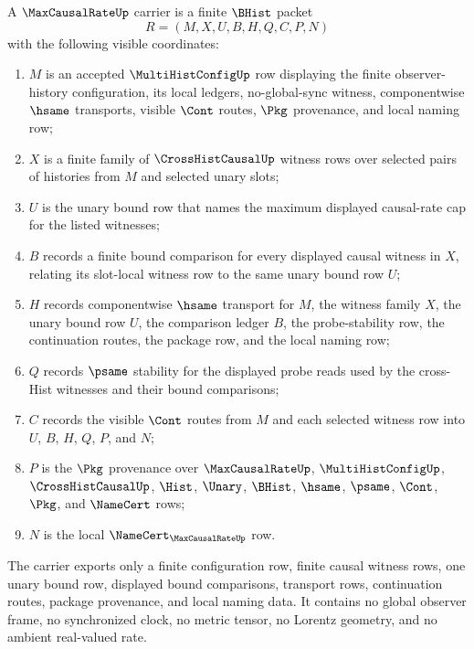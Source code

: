 \begin{definition}
\label{def:max-causal-rate-carrier}
A $\MaxCausalRateUp$ carrier is a finite $\BHist$ packet
$$
R=(M,X,U,B,H,Q,C,P,N)
$$
with the following visible coordinates:
\begin{enumerate}
\item $M$ is an accepted $\MultiHistConfigUp$ row displaying the finite observer-history configuration, its local ledgers, no-global-sync witness, componentwise $\hsame$ transports, visible $\Cont$ routes, $\Pkg$ provenance, and local naming row;
\item $X$ is a finite family of $\CrossHistCausalUp$ witness rows over selected pairs of histories from $M$ and selected unary slots;
\item $U$ is the unary bound row that names the maximum displayed causal-rate cap for the listed witnesses;
\item $B$ records a finite bound comparison for every displayed causal witness in $X$, relating its slot-local witness row to the same unary bound row $U$;
\item $H$ records componentwise $\hsame$ transport for $M$, the witness family $X$, the unary bound row $U$, the comparison ledger $B$, the probe-stability row, the continuation routes, the package row, and the local naming row;
\item $Q$ records $\psame$ stability for the displayed probe reads used by the cross-Hist witnesses and their bound comparisons;
\item $C$ records the visible $\Cont$ routes from $M$ and each selected witness row into $U$, $B$, $H$, $Q$, $P$, and $N$;
\item $P$ is the $\Pkg$ provenance over $\MaxCausalRateUp$, $\MultiHistConfigUp$, $\CrossHistCausalUp$, $\Hist$, $\Unary$, $\BHist$, $\hsame$, $\psame$, $\Cont$, $\Pkg$, and $\NameCert$ rows;
\item $N$ is the local $\NameCert_{\MaxCausalRateUp}$ row.
\end{enumerate}
The carrier exports only a finite configuration row, finite causal witness rows, one unary bound row, displayed bound comparisons, transport rows, continuation routes, package provenance, and local naming data. It contains no global observer frame, no synchronized clock, no metric tensor, no Lorentz geometry, and no ambient real-valued rate.
\end{definition}

